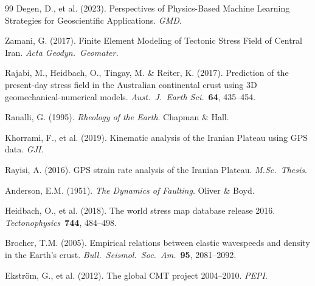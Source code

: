 \documentclass[11pt, a4paper]{article}
\begin{document}
\begin{thebibliography}{99}
Degen, D., et al. (2023). Perspectives of Physics-Based Machine Learning Strategies for Geoscientific Applications. \textit{GMD}.

Zamani, G. (2017). Finite Element Modeling of Tectonic Stress Field of Central Iran. \textit{Acta Geodyn.\ Geomater.}

Rajabi, M., Heidbach, O., Tingay, M. \& Reiter, K. (2017). Prediction of the present-day stress field in the Australian continental crust using 3D geomechanical-numerical models. \textit{Aust.\ J.\ Earth Sci.}\ \textbf{64}, 435--454.

Ranalli, G. (1995). \textit{Rheology of the Earth}. Chapman \& Hall.

Khorrami, F., et al. (2019). Kinematic analysis of the Iranian Plateau using GPS data. \textit{GJI}.

Rayisi, A. (2016). GPS strain rate analysis of the Iranian Plateau. \textit{M.Sc.\ Thesis}.

Anderson, E.M. (1951). \textit{The Dynamics of Faulting}. Oliver \& Boyd.

Heidbach, O., et al. (2018). The world stress map database release 2016. \textit{Tectonophysics}\ \textbf{744}, 484--498.

Brocher, T.M. (2005). Empirical relations between elastic wavespeeds and density in the Earth's crust. \textit{Bull.\ Seismol.\ Soc.\ Am.}\ \textbf{95}, 2081--2092.

Ekstr\"om, G., et al. (2012). The global CMT project 2004--2010. \textit{PEPI}.

\end{thebibliography}
\end{document}
